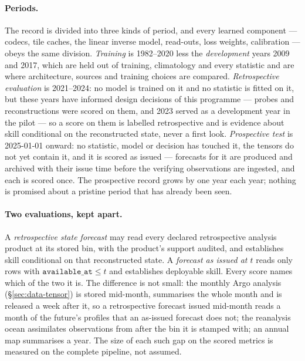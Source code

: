 \documentclass[10pt]{article}
\newcommand{\code}[1]{\texttt{#1}}
\begin{document}
\paragraph{Periods.} The record is divided into three kinds of period, and
every learned component --- codecs, tile caches, the linear inverse model,
read-outs, loss weights, calibration --- obeys the same division.
\emph{Training} is 1982--2020 less the \emph{development} years 2009 and
2017, which are held out of training, climatology and every statistic and
are where architecture, sources and training choices are compared.
\emph{Retrospective evaluation} is 2021--2024: no model is trained on it and
no statistic is fitted on it, but these years have informed design decisions
of this programme --- probes and reconstructions were scored on them, and
2023 served as a development year in the pilot --- so a score on them is
labelled retrospective and is evidence about skill conditional on the
reconstructed state, never a first look. \emph{Prospective test} is
2025-01-01 onward: no statistic, model or decision has touched it, the
tensors do not yet contain it, and it is scored as issued --- forecasts for
it are produced and archived with their issue time before the verifying
observations are ingested, and each is scored once. The prospective record
grows by one year each year; nothing is promised about a pristine period
that has already been seen.

\paragraph{Two evaluations, kept apart.} A \emph{retrospective state
forecast} may read every declared retrospective analysis product at its
stored bin, with the product's support audited, and establishes skill
conditional on that reconstructed state. A \emph{forecast as issued at $t$}
reads only rows with $\code{available\_at}\le t$ and establishes deployable
skill. Every score names which of the two it is. The difference is not
small: the monthly Argo analysis (\S\ref{sec:data-tensor}) is stored
mid-month, summarises the whole month and is released a week after it, so a
retrospective forecast issued mid-month reads a month of the future's
profiles that an as-issued forecast does not; the reanalysis ocean
assimilates observations from after the bin it is stamped with; an annual
map summarises a year. The size of each such gap on the scored metrics is
measured on the complete pipeline, not assumed.
\end{document}
